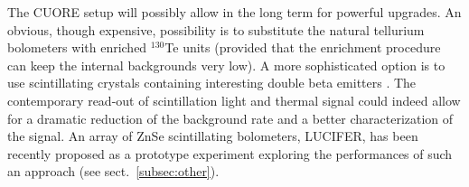 The CUORE setup will possibly allow in the long term for powerful upgrades. An obvious, though expensive, possibility is to substitute the natural tellurium bolometers with enriched $^{130}$Te units (provided that the enrichment procedure can keep the internal backgrounds very low). A more sophisticated option is to use scintillating crystals containing interesting double beta emitters \cite{Pirro:2005ar}. The contemporary read-out of scintillation light and thermal signal could indeed allow for a dramatic reduction of the background rate and a better characterization of the signal. An array of ZnSe scintillating bolometers, LUCIFER, has been recently proposed as a prototype experiment exploring the performances of such an approach \cite{Ferroni:2011zz} (see sect.~\ref{subsec:other}).


